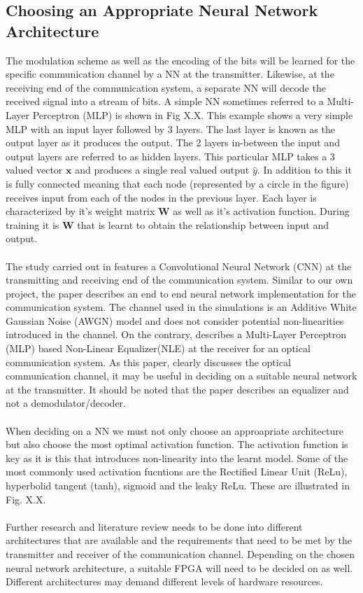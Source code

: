 \subsection{Choosing an Appropriate Neural Network Architecture}

The modulation scheme as well as the encoding of the bits will be learned for the specific communication channel by a NN at the transmitter. Likewise, at the receiving end of the communication system, a separate NN will decode the received signal into a stream of bits. A simple NN sometimes referred to a Multi-Layer Perceptron (MLP) is shown in Fig X.X. This example shows a very simple MLP with an input layer followed by 3 layers. The last layer is known as the output layer as it produces the output. The 2 layers in-between the input and output layers are referred to as hidden layers. This particular MLP takes a 3 valued vector $\boldsymbol{x}$ and produces a single real valued output $\hat{y}$. In addition to this it is fully connected meaning that each node (represented by a circle in the figure) receives input from each of the nodes in the previous layer. Each layer is characterized by it's weight matrix $\boldsymbol{W}$ as well as it's activation function. During training it is $\boldsymbol{W}$ that is learnt to obtain the relationship between input and output.
\\
\\
The study carried out in \autocite{8664650} features a Convolutional Neural Network (CNN) at the transmitting and receiving end of the communication system. Similar to our own project, the paper describes an end to end neural network implementation for the communication system. The channel used in the simulations is an Additive White Gaussian Noise (AWGN) model and does not consider potential non-linearities introduced in the channel. On the contrary, \autocite{6975096} describes a Multi-Layer Perceptron (MLP) based Non-Linear Equalizer(NLE) at the receiver for an optical communication system. As this paper, clearly discusses the optical communication channel, it may be useful in deciding on a suitable neural network at the transmitter. It should be noted that the paper describes an equalizer and not a demodulator/decoder. 
\\
\\
When deciding on a NN we must not only choose an approapriate architecture but also choose the most optimal activation function. The activation function is key as it is this that introduces non-linearity into the learnt model. Some of the most commonly used activation fucntions are the Rectified Linear Unit (ReLu), hyperbolid tangent (tanh), sigmoid and the leaky ReLu. These are illustrated in Fig. X.X.
\\
\\
Further research and literature review needs to be done into different architectures that are available and the requirements that need to be met by the transmitter and receiver of the communication channel. Depending on the chosen neural network architecture, a suitable FPGA will need to be decided on as well. Different architectures may demand different levels of hardware resources.

